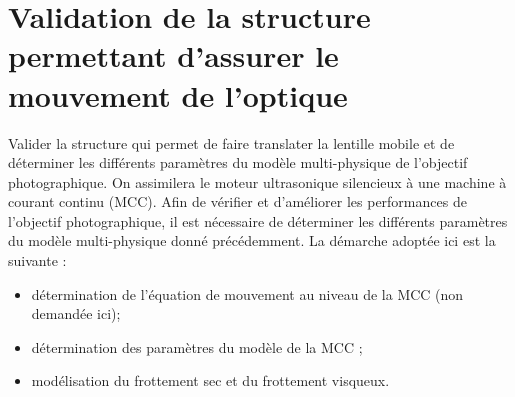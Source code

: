 %
%
%
%
%
%
%
%
%
%
%
%
%
%


\section{Validation de la structure permettant d'assurer le mouvement de l'optique}\label{validation-de-la-structure-permettant-dassurer-le-mouvement-de-loptique}

\begin{obj}
Valider la structure qui permet de faire translater la lentille mobile
et de déterminer les différents paramètres du modèle multi-physique de
l'objectif photographique. On assimilera le moteur ultrasonique silencieux à une machine à courant continu (MCC).
Afin de vérifier et d'améliorer les performances de l'objectif
photographique, il est nécessaire de déterminer les différents
paramètres du modèle multi-physique donné précédemment. La démarche
adoptée ici est la suivante :

\begin{itemize}
\item
  détermination de l'équation de mouvement au niveau de la MCC (non demandée ici);
\item
  détermination des paramètres du modèle de la MCC ;
\item
  modélisation du frottement sec et du frottement visqueux.
  \end{itemize}
\end{obj}

